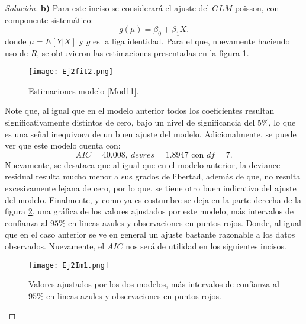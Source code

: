 \documentclass[10.5pt,notitlepage]{article}
\newenvironment{solucion}
  {\begin{proof}[Solución]}
  {\end{proof}}
\theoremstyle{plain}
\begin{document}
\begin{solucion}
\textbf{b)} Para este inciso se considerará el ajuste del \(GLM\) poisson, con componente sistemático: 
\begin{equation}\label{Mod11}
    g(\mu) = \beta_0 + \beta_1 X. 
\end{equation}
donde \(\mu = E[Y|X]\) y \(g\) es la liga identidad. Para el que, nuevamente haciendo uso de \(R\), se obtuvieron las estimaciones presentadas en la figura \ref{fig11}. 
\begin{figure}[htb]
    \centering
    \texttt{[image: Ej2fit2.png]}
    \caption{Estimaciones modelo \eqref{Mod11}.}
    \label{fig11}
\end{figure}
Note que, al igual que en el modelo anterior todos los coeficientes resultan significativamente distintos de cero, bajo un nivel de significancia del \(5\%\), lo que es una señal inequivoca de un buen ajuste del modelo. Adicionalmente, se puede ver que este modelo cuenta con: 
\begin{equation}\label{AIC11}
    AIC = 40.008, \ devres = 1.8947 \text{ con } df = 7.  
\end{equation}
Nuevamente, se desataca que al igual que en el modelo anterior, la deviance residual resulta mucho menor a sus grados de libertad, además de que, no resulta excesivamente lejana de cero, por lo que, se tiene otro buen indicativo del ajuste del modelo. Finalmente, y como ya es costumbre se deja en la parte derecha de la figura \ref{figtodas2}, una gráfica de los valores ajustados por este modelo, más intervalos de confianza al \(95\%\) en lineas azules y observaciones en puntos rojos. Donde, al igual que en el caso anterior se ve en general un ajuste bastante razonable a los datos observados. Nuevamente, el \(AIC\) nos será de utilidad en los siguientes incisos.\\ 
\begin{figure}[htb]
    \centering
    \texttt{[image: Ej2Im1.png]}
    \caption{Valores ajustados por los dos modelos, más intervalos de confianza al \(95\%\) en lineas azules y observaciones en puntos rojos.}
    \label{figtodas2}
\end{figure}


\end{solucion}
\end{document}
